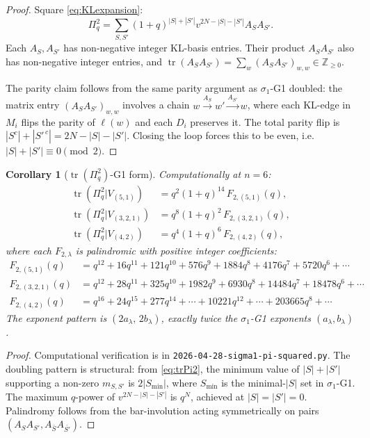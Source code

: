 \documentclass{article}
\newtheorem{corollary}[theorem]{Corollary}
\theoremstyle{definition}
\begin{document}
\begin{proof}
Square \eqref{eq:KLexpansion}:
\[
  \Pi_q^2 = \sum_{S,S'}(1+q)^{|S|+|S'|}v^{2N-|S|-|S'|}A_S A_{S'}.
\]
Each $A_S, A_{S'}$ has non-negative integer KL-basis entries. Their product
$A_S A_{S'}$ also has non-negative integer entries, and
$\operatorname{tr}(A_S A_{S'}) = \sum_w (A_S A_{S'})_{w,w} \in \mathbb{Z}_{\geq 0}$.

The parity claim follows from the same parity argument as $\sigma_1$-G1 doubled:
the matrix entry $(A_S A_{S'})_{w,w}$ involves a chain
$w \xrightarrow{A_S} w' \xrightarrow{A_{S'}} w$, where each KL-edge in $M_i$
flips the parity of $\ell(w)$ and each $D_i$ preserves it. The total parity
flip is $|S^c|+|S'^{\,c}| = 2N - |S| - |S'|$. Closing the loop forces this to be even,
i.e.\ $|S|+|S'|\equiv 0\pmod 2$.
\end{proof}

\begin{corollary}[$\operatorname{tr}(\Pi_q^2)$-G1 form]\label{cor:trPi2G1}
Computationally at $n=6$:
\begin{align}
  \operatorname{tr}(\Pi_q^2|V_{(5,1)}) &= q^2(1+q)^{14}\,F_{2,(5,1)}(q),\\
  \operatorname{tr}(\Pi_q^2|V_{(3,2,1)}) &= q^8(1+q)^2\,F_{2,(3,2,1)}(q),\\
  \operatorname{tr}(\Pi_q^2|V_{(4,2)}) &= q^4(1+q)^6\,F_{2,(4,2)}(q),
\end{align}
where each $F_{2,\lambda}$ is palindromic with positive integer coefficients:
\begin{align*}
  F_{2,(5,1)}(q) &= q^{12}+16q^{11}+121q^{10}+576q^9+1884q^8+4176q^7+5720q^6+\cdots\\
  F_{2,(3,2,1)}(q) &= q^{12}+28q^{11}+325q^{10}+1982q^9+6930q^8+14484q^7+18478q^6+\cdots\\
  F_{2,(4,2)}(q) &= q^{16}+24q^{15}+277q^{14}+\cdots+10221q^{12}+\cdots+203665q^8+\cdots
\end{align*}
The exponent pattern is $(2a_\lambda,\, 2b_\lambda)$, exactly twice the
$\sigma_1$-G1 exponents $(a_\lambda, b_\lambda)$.
\end{corollary}

\begin{proof}
Computational verification is in \texttt{2026-04-28-sigma1-pi-squared.py}.
The doubling pattern is structural: from \eqref{eq:trPi2}, the minimum value
of $|S|+|S'|$ supporting a non-zero $m_{S,S'}$ is $2|S_{\min}|$, where $S_{\min}$
is the minimal-$|S|$ set in $\sigma_1$-G1. The maximum $q$-power of $v^{2N-|S|-|S'|}$
is $q^{N}$, achieved at $|S|=|S'|=0$. Palindromy follows from the bar-involution
acting symmetrically on pairs $(A_S A_{S'}, A_{\bar S} A_{\bar{S'}})$.
\end{proof}
\end{document}
